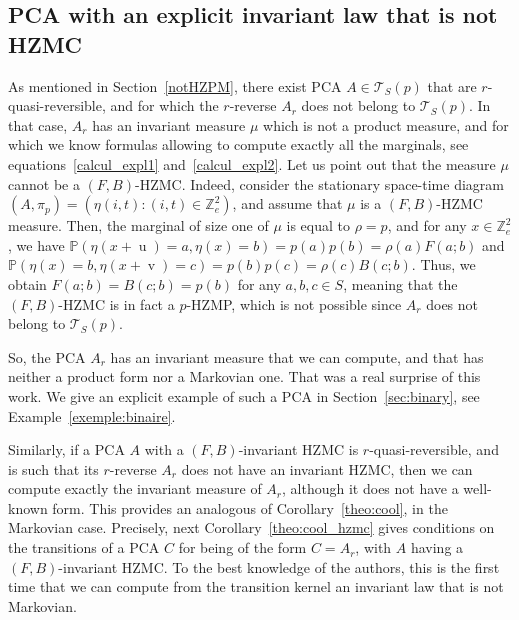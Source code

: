 \documentclass[AHL,Unicode,longabstracts]{cedram}
\newcounter{a}
\newcommand{\triangE}[1]{\mathcal{T}_{#1}}
\newcommand{\Z}{\mathbb{Z}}
\newcommand{\Pbb}{\mathbb{P}}
\DeclareMathOperator{\vu}{u}
\DeclareMathOperator{\vv}{v}
\begin{document}
\subsection{PCA with an explicit invariant law that is not HZMC}\label{sec:notmarkov}

As mentioned in Section~\ref{notHZPM}, there exist PCA $A\in\triangE{S}(p)$ that are $r$-quasi-reversible, and for which the $r$-reverse $A_r$ does not belong to $\triangE{S}(p)$. In that case, $A_r$ has an invariant measure $\mu$ which is not a product measure, and for which we know formulas allowing to compute exactly all the marginals, see equations~\eqref{calcul_expl1} and~\eqref{calcul_expl2}. Let us point out that the measure $\mu$ cannot be a $(F,B)$-HZMC. Indeed, consider the stationary space-time diagram $(A,\pi_p)=(\eta(i,t): (i,t) \in \Z_{e}^2)$, and assume that $\mu$ is a $(F,B)$-HZMC measure. Then, the marginal of size one of $\mu$ is equal to $\rho=p$, and for any $x\in \Z_{e}^2$, we have $\Pbb\left(\eta(x+\vu)=a,\eta(x)=b\right)=p(a)p(b)=\rho(a)F(a;b)$ and $\Pbb\left(\eta(x)=b,\eta(x+\vv)=c\right)=p(b)p(c)=\rho(c)B(c;b)$. Thus, we obtain \linebreak$F(a;b)=B(c;b)=p(b)$ for any $a,b,c\in S$, meaning that the $(F,B)$-HZMC is in fact a $p$-HZMP, which is not possible since $A_r$ does not belong to $\triangE{S}(p)$.

So, the PCA $A_r$ has an invariant measure that we can compute, and that has neither a product form nor a Markovian one. That was a real surprise of this work. We give an explicit example of such a PCA in Section~\ref{sec:binary}, see Example~\ref{exemple:binaire}.

Similarly, if a PCA $A$ with a $(F,B)$-invariant HZMC is $r$-quasi-reversible, and is such that its $r$-reverse $A_r$ does not have an invariant HZMC, then we can compute exactly the invariant measure of $A_r$, although it does not have a well-known form. This provides an analogous of Corollary~\ref{theo:cool}, in the Markovian case. Precisely, next Corollary~\ref{theo:cool_hzmc} gives conditions on the transitions of a PCA $C$ for being of the form $C=A_r$, with $A$ having a $(F,B)$-invariant HZMC. To the best knowledge of the authors, this is the first time that we can compute from the transition kernel an invariant law that is not Markovian.
\end{document}
